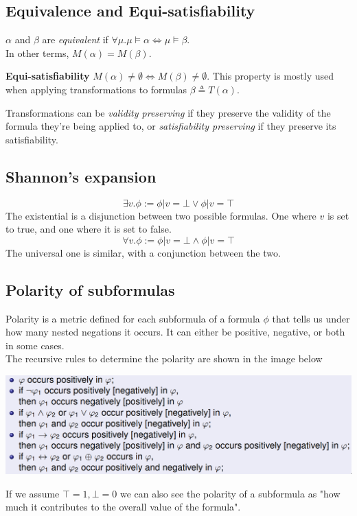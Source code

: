 \documentclass{article}
\begin{document}
\subsection*{Equivalence and Equi-satisfiability}
$\alpha$ and $\beta$ are \textit{equivalent} if $\forall \mu.\mu\models\alpha\iff\mu\models\beta$.\\
In other terms, $M(\alpha)=M(\beta)$.

\textbf{Equi-satisfiability} $M(\alpha)\neq\emptyset \iff M(\beta)\neq\emptyset$. This property is mostly used when applying transformations to formulas $\beta\triangleq T(\alpha)$.

Transformations can be \textit{validity preserving} if they preserve the validity of the formula they're being applied to, or \textit{satisfiability preserving} if they preserve its satisfiability.

\subsection*{Shannon's expansion}
$$\exists v.\phi := \phi|v=\bot \vee \phi|v=\top$$ The existential is a disjunction between two possible formulas. One where $v$ is set to true, and one where it is set to false.
$$\forall v.\phi := \phi|v=\bot \wedge \phi|v=\top$$ The universal one is similar, with a conjunction between the two.

\subsection*{Polarity of subformulas}
Polarity is a metric defined for each subformula of a formula $\phi$ that tells us under how many nested negations it occurs. It can either be positive, negative, or both in some cases.\\
The recursive rules to determine the polarity are shown in the image below
\begin{center}
    \includegraphics[width=0.8\linewidth]{images/polarity.png}
\end{center}

If we assume $\top=1,\bot=0$ we can also see the polarity of a subformula as "how much it contributes to the overall value of the formula".
\end{document}
